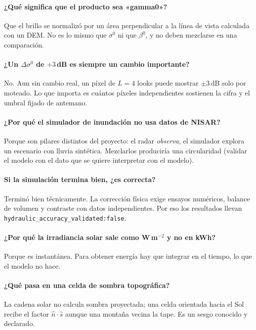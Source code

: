 \documentclass[11pt,a4paper]{article}
\begin{document}
\paragraph{¿Qué significa que el producto sea «gamma0»?}
Que el brillo se normalizó por un área perpendicular a la línea de vista calculada con un DEM. No es lo mismo
que $\sigma^0$ ni que $\beta^0$, y no deben mezclarse en una comparación.

\paragraph{¿Un $\Delta\sigma^0$ de $+3$\,dB es siempre un cambio importante?}
No. Aun sin cambio real, un píxel de $L=4$ looks puede mostrar $\pm3$\,dB solo por moteado. Lo que importa es
cuántos píxeles independientes sostienen la cifra y el umbral fijado de antemano.

\paragraph{¿Por qué el simulador de inundación no usa datos de NISAR?}
Porque son pilares distintos del proyecto: el radar \emph{observa}, el simulador explora un escenario con lluvia
sintética. Mezclarlos produciría una circularidad (validar el modelo con el dato que se quiere interpretar con
el modelo).

\paragraph{Si la simulación termina bien, ¿es correcta?}
Terminó bien técnicamente. La corrección física exige ensayos numéricos, balance de volumen y contraste con
datos independientes. Por eso los resultados llevan \texttt{hydraulic\_accuracy\_validated:false}.

\paragraph{¿Por qué la irradiancia solar sale como W\,m$^{-2}$ y no en kWh?}
Porque es instantánea. Para obtener energía hay que integrar en el tiempo, lo que el modelo no hace.

\paragraph{¿Qué pasa en una celda de sombra topográfica?}
La cadena solar no calcula sombra proyectada; una celda orientada hacia el Sol recibe el factor $\hat n\cdot\hat s$
aunque una montaña vecina la tape. Es un sesgo conocido y declarado.
\end{document}
